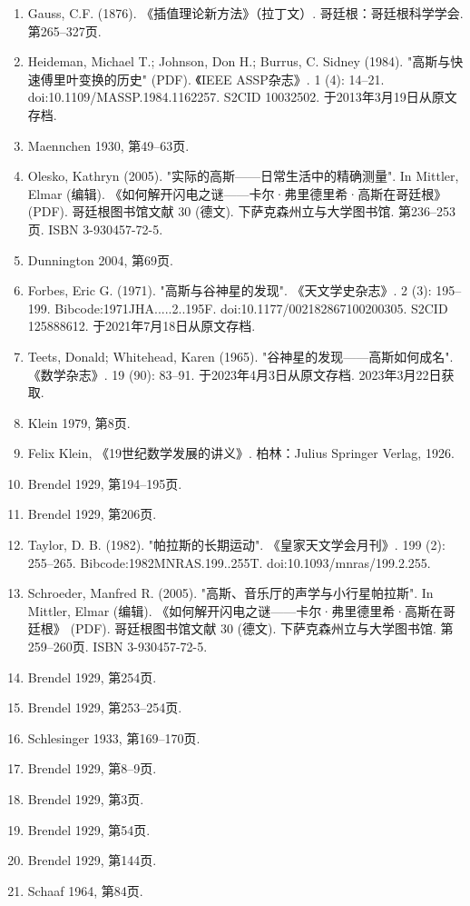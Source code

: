 \begin{enumerate}
\item Gauss, C.F. (1876). 《插值理论新方法》（拉丁文）. 哥廷根：哥廷根科学学会. 第265–327页.  
\item Heideman, Michael T.; Johnson, Don H.; Burrus, C. Sidney (1984). "高斯与快速傅里叶变换的历史" (PDF). 《IEEE ASSP杂志》. 1 (4): 14–21. doi:10.1109/MASSP.1984.1162257. S2CID 10032502. 于2013年3月19日从原文存档.  
\item Maennchen 1930, 第49–63页.  
\item Olesko, Kathryn (2005). "实际的高斯——日常生活中的精确测量". In Mittler, Elmar (编辑). 《如何解开闪电之谜——卡尔·弗里德里希·高斯在哥廷根》 (PDF). 哥廷根图书馆文献 30 (德文). 下萨克森州立与大学图书馆. 第236–253页. ISBN 3-930457-72-5.  
\item Dunnington 2004, 第69页.  
\item Forbes, Eric G. (1971). "高斯与谷神星的发现". 《天文学史杂志》. 2 (3): 195–199. Bibcode:1971JHA.....2..195F. doi:10.1177/002182867100200305. S2CID 125888612. 于2021年7月18日从原文存档.  
\item Teets, Donald; Whitehead, Karen (1965). "谷神星的发现——高斯如何成名". 《数学杂志》. 19 (90): 83–91. 于2023年4月3日从原文存档. 2023年3月22日获取.  
\item Klein 1979, 第8页.  
\item Felix Klein, 《19世纪数学发展的讲义》. 柏林：Julius Springer Verlag, 1926.  
\item Brendel 1929, 第194–195页.  
\item Brendel 1929, 第206页.  
\item Taylor, D. B. (1982). "帕拉斯的长期运动". 《皇家天文学会月刊》. 199 (2): 255–265. Bibcode:1982MNRAS.199..255T. doi:10.1093/mnras/199.2.255.  
\item Schroeder, Manfred R. (2005). "高斯、音乐厅的声学与小行星帕拉斯". In Mittler, Elmar (编辑). 《如何解开闪电之谜——卡尔·弗里德里希·高斯在哥廷根》 (PDF). 哥廷根图书馆文献 30 (德文). 下萨克森州立与大学图书馆. 第259–260页. ISBN 3-930457-72-5.
\item Brendel 1929, 第254页.  
\item Brendel 1929, 第253–254页.  
\item Schlesinger 1933, 第169–170页.  
\item Brendel 1929, 第8–9页.  
\item Brendel 1929, 第3页.  
\item Brendel 1929, 第54页.  
\item Brendel 1929, 第144页.  
\item Schaaf 1964, 第84页.  

\end{enumerate}
